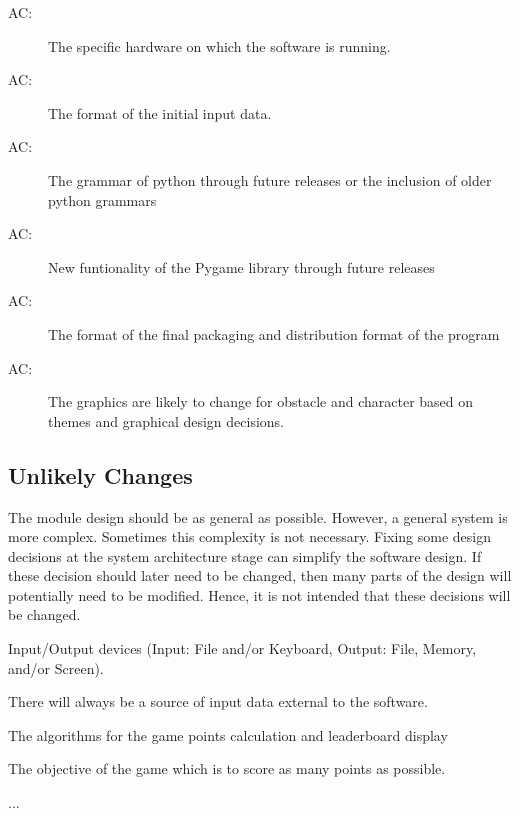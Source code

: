 \documentclass[12pt, titlepage]{article}
\newcounter{acnum}
\newcommand{\actheacnum}{AC\theacnum}
\newcounter{ucnum}
\newcommand{\uctheucnum}{UC\theucnum}
\begin{document}
\begin{description}
\item[ \actheacnum \label{acHardware}:] The specific
  hardware on which the software is running.
\item[ \actheacnum \label{acInput}:] The format of the
  initial input data.
\item[ \actheacnum \label{acInput}:] The grammar of python through future releases or the inclusion of older python grammars
\item[ \actheacnum \label{acInput}:] New funtionality of the Pygame library through future releases 
\item[ \actheacnum \label{acInput}:] The format of the final packaging and distribution format of the program
\item[ \actheacnum \label{acInput}:] The graphics are likely to change for obstacle and character based on themes and graphical design decisions. 
\end{description}

\subsection{Unlikely Changes} \label{SecUchange}

The module design should be as general as possible. However, a general system is
more complex. Sometimes this complexity is not necessary. Fixing some design
decisions at the system architecture stage can simplify the software design. If
these decision should later need to be changed, then many parts of the design
will potentially need to be modified. Hence, it is not intended that these
decisions will be changed.

\begin{description}
\item[ \uctheucnum \label{ucIO}:] Input/Output devices
  (Input: File and/or Keyboard, Output: File, Memory, and/or Screen).
\item[ \uctheucnum \label{ucInput}:] There will always be
  a source of input data external to the software.
\item[ \uctheucnum \label{ucInput}:] The algorithms for the game points calculation and leaderboard display
\item[ \uctheucnum \label{ucInput}:] The objective of the game which is to score as many points as possible. 
\item ...
\end{description}
\end{document}
